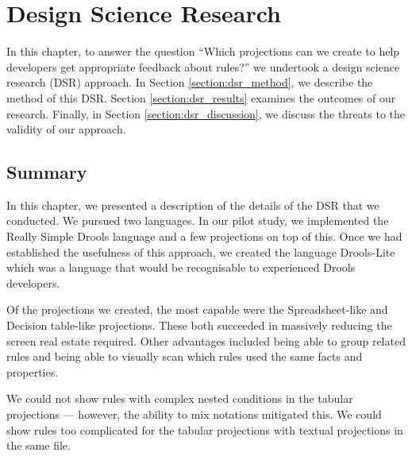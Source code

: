 \chapter{Design Science Research}
\label{chapter:DSR}

In this chapter, to answer the question ``Which projections can we create to help developers get appropriate feedback about rules?'' we undertook a design science research (DSR) approach.
In Section \ref{section:dsr_method}, we describe the method of this DSR.
Section \ref{section:dsr_results} examines the outcomes of our research.
Finally, in Section \ref{section:dsr_discussion}, we discuss the threats to the validity of our approach.







\section{Summary}
In this chapter, we presented a description of the details of the DSR that we conducted.
We pursued two languages.
In our pilot study, we implemented the Really Simple Drools language and a few projections on top of this.
Once we had established the usefulness of this approach, we created the language Drools-Lite which was a language that would be recognisable to experienced Drools developers.

Of the projections we created, the most capable were the Spreadsheet-like and Decision table-like projections.
These both succeeded in massively reducing the screen real estate required.
Other advantages included being able to group related rules and being able to visually scan which rules used the same facts and properties.

We could not show rules with complex nested conditions in the tabular projections — however, the ability to mix notations mitigated this.
We could show rules too complicated for the tabular projections with textual projections in the same file.